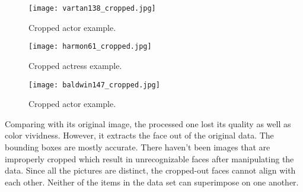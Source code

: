 \documentclass{article}
\begin{document}
\begin{part1}
\begin{figure*}[!ht]
\begin{subfigure}{.35\textwidth}
  \texttt{[image: vartan138\_cropped.jpg]}
  \caption{Cropped actor example.}
  \label{fig:sfig1}
\end{subfigure}
\begin{subfigure}{.35\textwidth}
  \texttt{[image: harmon61\_cropped.jpg]}
  \caption{Cropped actress example.}
  \label{fig:sfig2}
\end{subfigure}%
\begin{subfigure}{.35\textwidth}
  \texttt{[image: baldwin147\_cropped.jpg]}
  \caption{Cropped actor example.}
  \label{fig:sfig3}
\end{subfigure}
\end{figure*}

Comparing with its original image, the processed one lost its quality as well as color vividness. However, it extracts the face out of the original data. The bounding boxes are mostly accurate. There haven't been images that are improperly cropped which result in unrecognizable faces after manipulating the data. Since all the pictures are distinct, the cropped-out faces cannot align with each other. Neither of the items in the data set can superimpose on one another. 

\end{part1}
\end{document}
